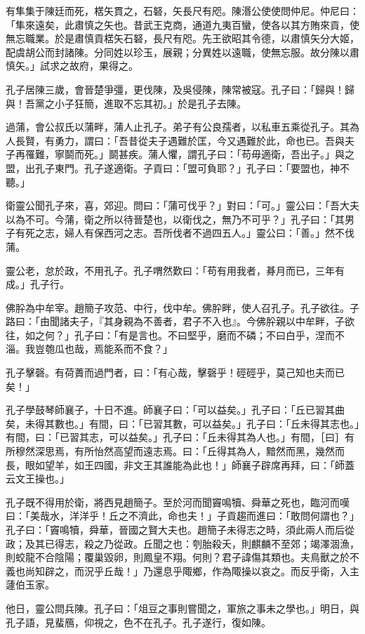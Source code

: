 \begin{pinyinscope}
有隼集于陳廷而死，楛矢貫之，石砮，矢長尺有咫。陳湣公使使問仲尼。仲尼曰：「隼來遠矣，此肅慎之矢也。昔武王克商，通道九夷百蠻，使各以其方賄來貢，使無忘職業。於是肅慎貢楛矢石砮，長尺有咫。先王欲昭其令德，以肅慎矢分大姬，配虞胡公而封諸陳。分同姓以珍玉，展親；分異姓以遠職，使無忘服。故分陳以肅慎矢。」試求之故府，果得之。

孔子居陳三歲，會晉楚爭彊，更伐陳，及吳侵陳，陳常被寇。孔子曰：「歸與！歸與！吾黨之小子狂簡，進取不忘其初。」於是孔子去陳。

過蒲，會公叔氏以蒲畔，蒲人止孔子。弟子有公良孺者，以私車五乘從孔子。其為人長賢，有勇力，謂曰：「吾昔從夫子遇難於匡，今又遇難於此，命也已。吾與夫子再罹難，寧鬬而死。」鬬甚疾。蒲人懼，謂孔子曰：「苟毋適衛，吾出子。」與之盟，出孔子東門。孔子遂適衛。子貢曰：「盟可負耶？」孔子曰：「要盟也，神不聽。」

衛靈公聞孔子來，喜，郊迎。問曰：「蒲可伐乎？」對曰：「可。」靈公曰：「吾大夫以為不可。今蒲，衛之所以待晉楚也，以衛伐之，無乃不可乎？」孔子曰：「其男子有死之志，婦人有保西河之志。吾所伐者不過四五人。」靈公曰：「善。」然不伐蒲。

靈公老，怠於政，不用孔子。孔子喟然歎曰：「苟有用我者，朞月而已，三年有成。」孔子行。

佛肸為中牟宰。趙簡子攻范、中行，伐中牟。佛肸畔，使人召孔子。孔子欲往。子路曰：「由聞諸夫子，『其身親為不善者，君子不入也』。今佛肸親以中牟畔，子欲往，如之何？」孔子曰：「有是言也。不曰堅乎，磨而不磷；不曰白乎，涅而不淄。我豈匏瓜也哉，焉能系而不食？」

孔子擊磬。有荷蕢而過門者，曰：「有心哉，擊磬乎！硜硜乎，莫己知也夫而已矣！」

孔子學鼓琴師襄子，十日不進。師襄子曰：「可以益矣。」孔子曰：「丘已習其曲矣，未得其數也。」有間，曰：「已習其數，可以益矣。」孔子曰：「丘未得其志也。」有間，曰：「已習其志，可以益矣。」孔子曰：「丘未得其為人也。」有間，［曰］有所穆然深思焉，有所怡然高望而遠志焉。曰：「丘得其為人，黯然而黑，幾然而長，眼如望羊，如王四國，非文王其誰能為此也！」師襄子辟席再拜，曰：「師蓋云文王操也。」

孔子既不得用於衛，將西見趙簡子。至於河而聞竇鳴犢、舜華之死也，臨河而嘆曰：「美哉水，洋洋乎！丘之不濟此，命也夫！」子貢趨而進曰：「敢問何謂也？」孔子曰：「竇鳴犢，舜華，晉國之賢大夫也。趙簡子未得志之時，須此兩人而后從政；及其已得志，殺之乃從政。丘聞之也：刳胎殺夭，則麒麟不至郊；竭澤涸漁，則蛟龍不合陰陽；覆巢毀卵，則鳳皇不翔。何則？君子諱傷其類也。夫鳥獸之於不義也尚知辟之，而況乎丘哉！」乃還息乎陬鄉，作為陬操以哀之。而反乎衛，入主蘧伯玉家。

他日，靈公問兵陳。孔子曰：「俎豆之事則嘗聞之，軍旅之事未之學也。」明日，與孔子語，見蜚鴈，仰視之，色不在孔子。孔子遂行，復如陳。


\end{pinyinscope}
